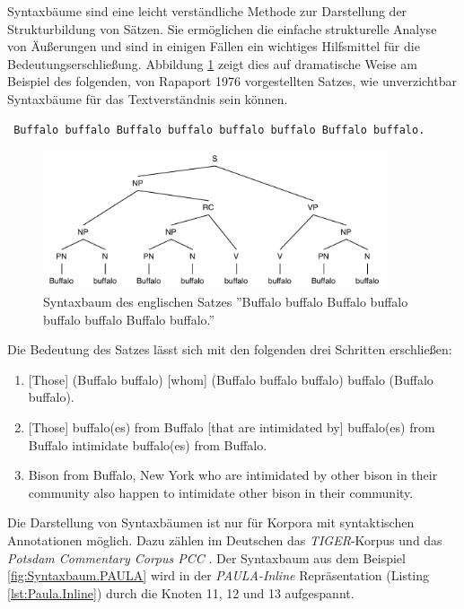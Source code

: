 Syntaxbäume sind eine leicht verständliche Methode zur Darstellung der Strukturbildung von Sätzen. Sie ermöglichen die einfache strukturelle Analyse von Äußerungen und sind in einigen Fällen ein wichtiges Hilfsmittel für die Bedeutungserschließung. Abbildung \ref{fig:SyntaxbaumBuffalo} zeigt dies auf dramatische Weise am Beispiel des folgenden, von Rapaport 1976 \citep[vgl.][]{rapaport2006buffallo} vorgestellten Satzes, wie unverzichtbar Syntaxbäume für das Textverständnis sein können.

\begin{verbatim}
 Buffalo buffalo Buffalo buffalo buffalo buffalo Buffalo buffalo.
\end{verbatim}

\begin{figure}[H]
	\centering
	\includegraphics*[width=0.9\textwidth]{figures/DA/SyntaxbaumBuffalo.pdf}
	\caption{Syntaxbaum des englischen Satzes ''Buffalo buffalo Buffalo buffalo buffalo buffalo Buffalo buffalo.'' \citep[nach][]{rapaport2006buffallo}}\label{fig:SyntaxbaumBuffalo}
\end{figure}

\newpage
Die Bedeutung des Satzes lässt sich mit den folgenden drei Schritten erschließen:

\begin{enumerate}
	\item{[Those] (Buffalo buffalo) [whom] (Buffalo buffalo buffalo) buffalo (Buffalo buffalo).}
	\item{[Those] buffalo(es) from Buffalo [that are intimidated by] buffalo(es) from Buffalo intimidate buffalo(es) from Buffalo.}
	\item{Bison from Buffalo, New York who are intimidated by other bison in their community also happen to intimidate other bison in their community.}
\end{enumerate}

Die Darstellung von Syntaxbäumen ist nur für Korpora mit syntaktischen Annotationen möglich. Dazu zählen im Deutschen das \emph{TIGER}-Korpus \citep[vgl.][]{lezius02} und das \emph{Potsdam Commentary Corpus PCC} \citep[vgl.][]{stede2004pcc}. Der Syntaxbaum aus dem Beispiel \ref{fig:Syntaxbaum.PAULA} wird in der \emph{PAULA-Inline} Repräsentation (Listing \ref{lst:Paula.Inline}) durch die Knoten 11, 12 und 13 aufgespannt.



